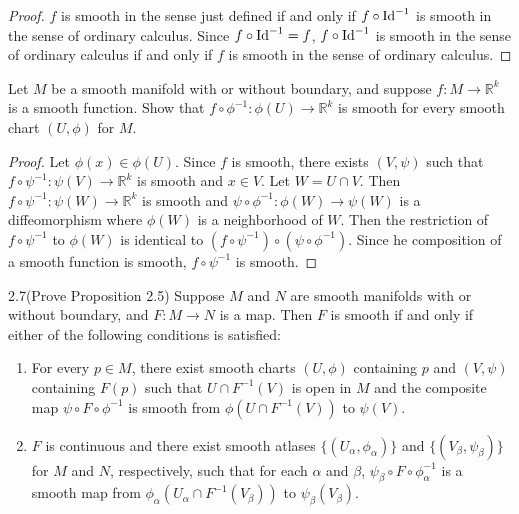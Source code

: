 \begin{proof}
  $f$ is smooth in the sense just defined if and only if $f \circ \operatorname{Id}^{-1}$ is smooth in the sense of ordinary calculus.
  Since $f \circ \operatorname{Id}^{-1} = f$, $f \circ \operatorname{Id}^{-1}$ is smooth in the sense of ordinary calculus if and only if $f$ is smooth in the sense of ordinary calculus.
\end{proof}

\begin{customexer}{2.3}\label{ex_2_3}
  Let $M$ be a smooth manifold with or without boundary, and suppose $f: M \rightarrow \mathbb{R}^k$ is a smooth function.
  Show that $f \circ \phi^{-1}: \phi(U) \rightarrow \mathbb{R}^k$ is smooth for every smooth chart $(U, \phi)$ for $M$.
\end{customexer}

\begin{proof}
  Let $\phi(x) \in \phi(U)$.
  Since $f$ is smooth, there exists $(V, \psi)$ such that $f \circ \psi^{-1}: \psi(V) \rightarrow \mathbb{R}^k$ is smooth and $x \in V$.
  Let $W = U \cap V$.
  Then $f \circ \psi^{-1}: \psi(W) \rightarrow \mathbb{R}^k$ is smooth and $\psi \circ \phi^{-1}: \phi(W) \rightarrow \psi(W)$ is a diffeomorphism where $\phi(W)$ is a neighborhood of $W$.
  Then the restriction of $f \circ \psi^{-1}$ to $\phi(W)$ is identical to $(f \circ \psi^{-1}) \circ (\psi \circ \phi^{-1})$.
  Since he composition of a smooth function is smooth, $f \circ \psi^{-1}$ is smooth.
\end{proof}

\begin{customexer}{2.7(Prove Proposition 2.5)}\label{proof_prop_2_5}
  Suppose $M$ and $N$ are smooth manifolds with or without boundary, and $F: M \rightarrow N$ is a map.
  Then $F$ is smooth if and only if either of the following conditions is satisfied:
  \begin{enumerate}[label=(\alph*)]
    \item 
      For every $p \in M$, there exist smooth charts $(U, \phi)$ containing $p$ and $(V, \psi)$ containing $F(p)$ such that $U \cap F^{-1}(V)$ is open in $M$ and the composite map $\psi \circ F \circ \phi^{-1}$ is smooth from $\phi(U \cap F^{-1}(V))$ to $\psi(V)$.
    \item
      $F$ is continuous and there exist smooth atlases $\{ (U_{\alpha}, \phi_{\alpha}) \}$ and $\{ (V_{\beta}, \psi_{\beta}) \}$ for $M$ and $N$, respectively, such that for each $\alpha$ and $\beta$, $\psi_{\beta} \circ F \circ \phi_{\alpha}^{-1}$ is a smooth map from $\phi_{\alpha}(U_{\alpha} \cap F^{-1}(V_{\beta}))$ to $\psi_{\beta}(V_{\beta})$.
  \end{enumerate}
\end{customexer}

